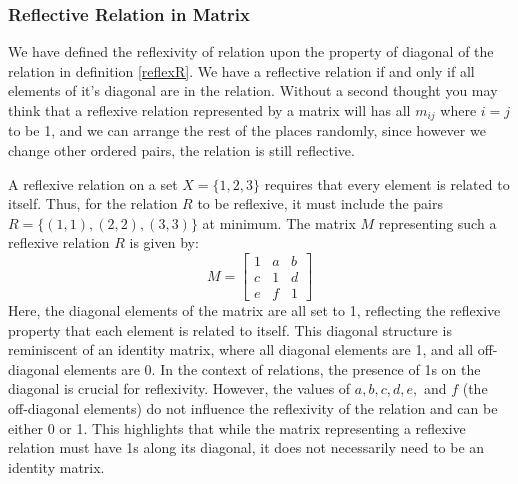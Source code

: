 	\subsubsection*{Reflective Relation in Matrix}
	We have defined the reflexivity of relation upon the property of diagonal of the relation in definition \ref{reflexR}. We have a reflective relation if and only if all elements of it's diagonal are in the relation. Without a second thought you may think that a reflexive relation represented by a matrix will has all $m_{ij}$ where $i=j$ to be 1, and we can arrange the rest of the places randomly, since however we change other ordered pairs, the relation is still reflective.
	\begin{example}
		A reflexive relation on a set \( X = \{1, 2, 3\} \) requires that every element is related to itself. Thus, for the relation \( R \) to be reflexive, it must include the pairs \( R = \{(1, 1), (2, 2), (3, 3)\}\) at minimum. The matrix \( M \) representing such a reflexive relation \( R \) is given by:
		$$
		M = \begin{bmatrix}
			1 & a & b \\
			c & 1 & d \\
			e & f & 1
		\end{bmatrix}
		$$
		Here, the diagonal elements of the matrix are all set to 1, reflecting the reflexive property that each element is related to itself. This diagonal structure is reminiscent of an identity matrix, where all diagonal elements are 1, and all off-diagonal elements are 0. In the context of relations, the presence of 1s on the diagonal is crucial for reflexivity. However, the values of \( a, b, c, d, e, \) and \( f \) (the off-diagonal elements) do not influence the reflexivity of the relation and can be either 0 or 1. This highlights that while the matrix representing a reflexive relation must have 1s along its diagonal, it does not necessarily need to be an identity matrix.
	\end{example}
